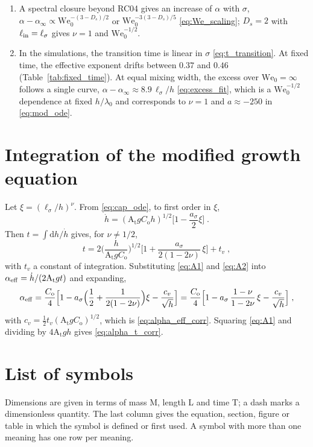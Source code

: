 \documentclass[11pt]{article}
\numberwithin{equation}{section}
\newcommand{\At}{\mathrm{A_t}}
\newcommand{\We}{\mathrm{We}_0}
\newcommand{\ls}{\ell_\sigma}
\newcommand{\hd}{\dot h}
\begin{document}
\begin{enumerate}
\item A spectral closure beyond RC04 gives an increase of $\alpha$ with $\sigma$, $\alpha - \alpha_\infty \propto \We^{-(3 - D_s)/2}$ or $\We^{-3(3 - D_s)/5}$ \eqref{eq:We_scaling}; $D_s = 2$ with $\ell_{\rm in} = \ls$ gives $\nu = 1$ and $\We^{-1/2}$.
\item In the simulations, the transition time is linear in $\sigma$ \eqref{eq:t_transition}. At fixed time, the effective exponent drifts between $0.37$ and $0.46$ (Table~\ref{tab:fixed_time}). At equal mixing width, the excess over $\We = \infty$ follows a single curve, $\alpha - \alpha_\infty \approx 8.9 \, \ls/h$ \eqref{eq:excess_fit}, which is a $\We^{-1/2}$ dependence at fixed $h/\lambda_0$ and corresponds to $\nu = 1$ and $a \approx -250$ in \eqref{eq:mod_ode}.
\end{enumerate}

\appendix
\section{Integration of the modified growth equation}\label{app:integration}
Let $\xi = (\ls/h)^{\nu}$. From \eqref{eq:cap_ode}, to first order in $\xi$,
\begin{equation}\label{eq:A1}
\hd = (\At g C_\mathrm{o} h)^{1/2} \Big[1 - \frac{a_\sigma}{2} \xi\Big] \;.
\end{equation}
Then $t = \int \mathrm d h/\hd$ gives, for $\nu \ne 1/2$,
\begin{equation}\label{eq:A2}
t = 2 \Big(\frac{h}{\At g C_\mathrm{o}}\Big)^{1/2} \Big[1 + \frac{a_\sigma}{2(1 - 2 \nu)} \, \xi\Big] + t_v \;,
\end{equation}
with $t_v$ a constant of integration. Substituting \eqref{eq:A1} and \eqref{eq:A2} into $\alpha_{\rm eff} = \hd/(2 \At g t)$ and expanding,
\begin{equation}\label{eq:A3}
\alpha_{\rm eff} = \frac{C_\mathrm{o}}{4} \Big[1 - a_\sigma \Big(\frac12 + \frac{1}{2(1 - 2 \nu)}\Big) \xi - \frac{c_v}{\sqrt h}\Big]
= \frac{C_\mathrm{o}}{4} \Big[1 - a_\sigma \, \frac{1 - \nu}{1 - 2 \nu} \, \xi - \frac{c_v}{\sqrt h}\Big] \;,
\end{equation}
with $c_v = \tfrac12 t_v(\At g C_\mathrm{o})^{1/2}$, which is \eqref{eq:alpha_eff_corr}. Squaring \eqref{eq:A1} and dividing by $4 \At g h$ gives \eqref{eq:alpha_t_corr}.

\section*{List of symbols}
Dimensions are given in terms of mass M, length L and time T; a dash marks a dimensionless quantity. The last column gives the equation, section, figure or table in which the symbol is defined or first used. A symbol with more than one meaning has one row per meaning.
\end{document}
